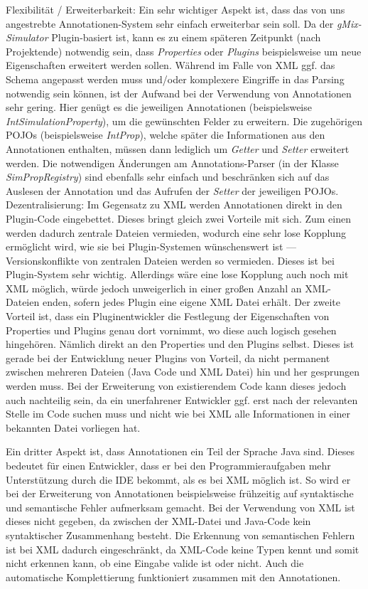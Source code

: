\documentclass[a4paper, 11pt]{article} %
\begin{document}
Flexibilität / Erweiterbarkeit: Ein sehr wichtiger Aspekt ist, dass das von uns angestrebte Annotationen-System sehr einfach erweiterbar sein soll. Da der \emph{gMix-Simulator} Plugin-basiert ist, kann es zu einem späteren Zeitpunkt (nach Projektende) notwendig sein, dass \emph{Properties} oder \emph{Plugins} beispielsweise um neue Eigenschaften erweitert werden sollen. Während im Falle von XML ggf. das Schema angepasst werden muss und/oder komplexere Eingriffe in das Parsing notwendig sein können, ist der Aufwand bei der Verwendung von Annotationen sehr gering. Hier genügt es die jeweiligen Annotationen (beispielsweise \emph{IntSimulationProperty}), um die gewünschten Felder zu erweitern. Die zugehörigen POJOs (beispielsweise \emph{IntProp}), welche später die Informationen aus den Annotationen enthalten, müssen dann lediglich um \emph{Getter} und \emph{Setter} erweitert werden. Die notwendigen Änderungen am Annotations-Parser (in der Klasse \emph{SimPropRegistry}) sind ebenfalls sehr einfach und beschränken sich auf das Auslesen der Annotation und das Aufrufen der \emph{Setter} der jeweiligen POJOs.\\

Dezentralisierung: Im Gegensatz zu XML werden Annotationen direkt in den Plugin-Code eingebettet. Dieses bringt gleich zwei Vorteile mit sich. Zum einen werden dadurch zentrale Dateien vermieden, wodurch eine sehr lose Kopplung ermöglicht wird, wie sie bei Plugin-Systemen wünschenswert ist --- Versionskonflikte von zentralen Dateien werden so vermieden. Dieses ist bei Plugin-System sehr wichtig. Allerdings wäre eine lose Kopplung auch noch mit XML möglich, würde jedoch unweigerlich in einer großen Anzahl an XML-Dateien enden, sofern jedes Plugin eine eigene XML Datei erhält. Der zweite Vorteil ist, dass ein Pluginentwickler die Festlegung der Eigenschaften von Properties und Plugins genau dort vornimmt, wo diese auch logisch gesehen hingehören. Nämlich direkt an den Properties und den Plugins selbst. Dieses ist gerade bei der Entwicklung neuer Plugins von Vorteil, da nicht permanent zwischen mehreren Dateien (Java Code und XML Datei) hin und her gesprungen werden muss. Bei der Erweiterung von existierendem Code kann dieses jedoch auch nachteilig sein, da ein unerfahrener Entwickler ggf. erst nach der relevanten Stelle im Code suchen muss und nicht wie bei XML alle Informationen in einer bekannten Datei vorliegen hat.

Ein dritter Aspekt ist, dass Annotationen ein Teil der Sprache Java sind. Dieses bedeutet für einen Entwickler, dass er bei den Programmieraufgaben mehr Unterstützung durch die IDE bekommt, als es bei XML möglich ist. So wird er bei der Erweiterung von Annotationen beispielsweise frühzeitig auf syntaktische und semantische Fehler aufmerksam gemacht. Bei der Verwendung von XML ist dieses nicht gegeben, da zwischen der XML-Datei und Java-Code kein syntaktischer Zusammenhang besteht. Die Erkennung von semantischen Fehlern ist bei XML dadurch eingeschränkt, da XML-Code keine Typen kennt und somit nicht erkennen kann, ob eine Eingabe valide ist oder nicht. Auch die automatische Komplettierung funktioniert zusammen mit den Annotationen.\\
\end{document}
